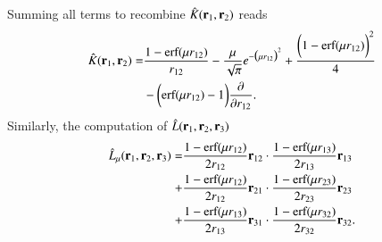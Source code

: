\documentclass[aip,jcp,reprint,noshowkeys,superscriptaddress]{revtex4-1}
\newcommand{\deriv}[3]{\frac{\partial^{#3} #1}{\partial {#2}^{#3}}}
\newcommand{\bri}[1]{{\bf r}_{#1}}
\begin{document}
Summing all terms to recombine $\hat{K}(\bri{1},\bri{2})$ reads 
\begin{equation}
 \label{eq:k_final}
  \begin{aligned}
   \hat{K}(\bri{1},\bri{2}) = & \frac{1 - \text{erf}(\mu r_{12})}{r_{12}} - \frac{\mu}{\sqrt{\pi}} e^{-\big(\mu r_{12} \big)^2} + \frac{\bigg(1 -     \text{erf}(\mu r_{12}) \bigg)^2}{4} \\
& - \bigg( \text{erf}(\mu r_{12}) - 1\bigg) \deriv{}{r_{12}}{}.
  \end{aligned}
\end{equation}
Similarly, the computation of $\hat{L}(\bri{1},\bri{2},\bri{3}) $ 
\begin{equation}
 \label{eq:l_final}
 \begin{aligned}
 \hat{L}_\mu(\bri{1},\bri{2},\bri{3}) = & \frac{1 - \text{erf}(\mu r_{12})}{2 r_{12}} \bri{12} \cdot \frac{1 - \text{erf}(\mu r_{13})}{2 r_{13}} \bri{13} \\
                                      + & \frac{1 - \text{erf}(\mu r_{12})}{2 r_{12}} \bri{21} \cdot \frac{1 - \text{erf}(\mu r_{23})}{2 r_{23}} \bri{23} \\
                                      + & \frac{1 - \text{erf}(\mu r_{13})}{2 r_{13}} \bri{31} \cdot \frac{1 - \text{erf}(\mu r_{32})}{2 r_{32}} \bri{32}.
 \end{aligned}                    
\end{equation}
\end{document}
